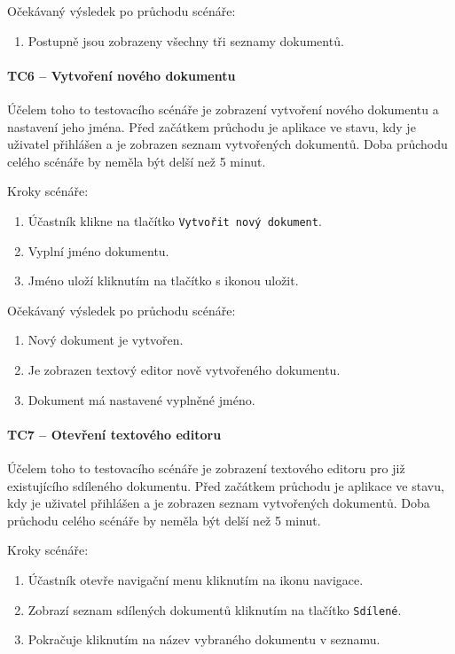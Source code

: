 Očekávaný výsledek po průchodu scénáře:
\begin{enumerate}
    \item Postupně jsou zobrazeny všechny tři seznamy dokumentů.
\end{enumerate}


\paragraph{TC6 -- Vytvoření nového dokumentu}

Účelem toho to testovacího scénáře je zobrazení vytvoření nového dokumentu a nastavení jeho jména.
Před začátkem průchodu je aplikace ve stavu, kdy je uživatel přihlášen a je zobrazen seznam vytvořených dokumentů.
Doba průchodu celého scénáře by neměla být delší než 5 minut.

Kroky scénáře:
\begin{enumerate}
    \item Účastník klikne na tlačítko \texttt{Vytvořit nový dokument}.
    \item Vyplní jméno dokumentu.
    \item Jméno uloží kliknutím na tlačítko s ikonou uložit.
\end{enumerate}

Očekávaný výsledek po průchodu scénáře:
\begin{enumerate}
    \item Nový dokument je vytvořen.
    \item Je zobrazen textový editor nově vytvořeného dokumentu.
    \item Dokument má nastavené vyplněné jméno.
\end{enumerate}

\paragraph{TC7 -- Otevření textového editoru}

Účelem toho to testovacího scénáře je zobrazení textového editoru pro již existujícího sdíleného dokumentu.
Před začátkem průchodu je aplikace ve stavu, kdy je uživatel přihlášen a je zobrazen seznam vytvořených dokumentů.
Doba průchodu celého scénáře by neměla být delší než 5 minut.

Kroky scénáře:
\begin{enumerate}
    \item Účastník otevře navigační menu kliknutím na ikonu navigace.
    \item Zobrazí seznam sdílených dokumentů kliknutím na tlačítko \texttt{Sdílené}.
    \item Pokračuje kliknutím na název vybraného dokumentu v seznamu.
\end{enumerate}

